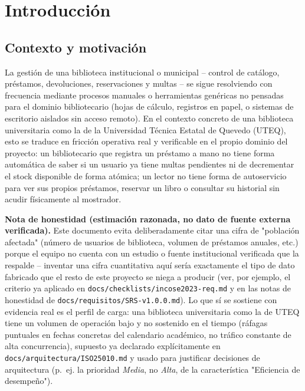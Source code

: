 \chapter{Introducción}
\label{cap:introduccion}

\section{Contexto y motivación}

La gestión de una biblioteca institucional o municipal -- control de
catálogo, préstamos, devoluciones, reservaciones y multas -- se sigue
resolviendo con frecuencia mediante procesos manuales o herramientas
genéricas no pensadas para el dominio bibliotecario (hojas de cálculo,
registros en papel, o sistemas de escritorio aislados sin acceso
remoto). En el contexto concreto de una biblioteca universitaria como la
de la Universidad Técnica Estatal de Quevedo (UTEQ), esto se traduce en
fricción operativa real y verificable en el propio dominio del
proyecto: un bibliotecario que registra un préstamo a mano no tiene
forma automática de saber si un usuario ya tiene multas pendientes ni de
decrementar el stock disponible de forma atómica; un lector no tiene
forma de autoservicio para ver sus propios préstamos, reservar un libro
o consultar su historial sin acudir físicamente al mostrador.

\textbf{Nota de honestidad (estimación razonada, no dato de fuente
externa verificada).} Este documento evita deliberadamente citar una
cifra de "población afectada" (número de usuarios de biblioteca,
volumen de préstamos anuales, etc.) porque el equipo no cuenta con un
estudio o fuente institucional verificada que la respalde -- inventar
una cifra cuantitativa aquí sería exactamente el tipo de dato fabricado
que el resto de este proyecto se niega a producir (ver, por ejemplo, el
criterio ya aplicado en \texttt{docs/checklists/incose2023-req.md} y en
las notas de honestidad de \texttt{docs/requisitos/SRS-v1.0.0.md}). Lo
que sí se sostiene con evidencia real es el perfil de carga: una
biblioteca universitaria como la de UTEQ tiene un volumen de operación
bajo y no sostenido en el tiempo (ráfagas puntuales en fechas concretas
del calendario académico, no tráfico constante de alta concurrencia),
supuesto ya declarado explícitamente en
\texttt{docs/arquitectura/ISO25010.md} y usado para justificar
decisiones de arquitectura (p.~ej. la prioridad \emph{Media}, no
\emph{Alta}, de la característica "Eficiencia de desempeño").

